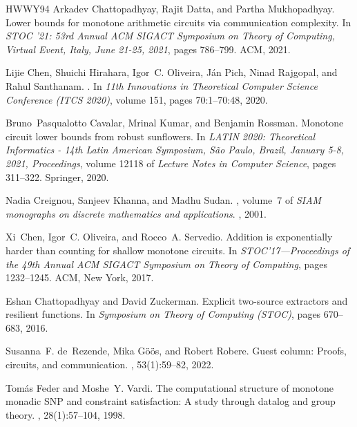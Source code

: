 \documentclass[10pt,a4paper]{article}
\begin{document}
\begin{thebibliography}{HWWY94}
Arkadev Chattopadhyay, Rajit Datta, and Partha Mukhopadhyay.
\newblock Lower bounds for monotone arithmetic circuits via communication
  complexity.
\newblock In {\em {STOC} '21: 53rd Annual {ACM} {SIGACT} Symposium on Theory of
  Computing, Virtual Event, Italy, June 21-25, 2021}, pages 786--799. {ACM},
  2021.

Lijie Chen, Shuichi Hirahara, Igor~C. Oliveira, J{\'a}n Pich, Ninad Rajgopal,
  and Rahul Santhanam.
.
\newblock In {\em 11th Innovations in Theoretical Computer Science Conference
  (ITCS 2020)}, volume 151, pages 70:1--70:48, 2020.

Bruno~Pasqualotto Cavalar, Mrinal Kumar, and Benjamin Rossman.
\newblock Monotone circuit lower bounds from robust sunflowers.
\newblock In {\em {LATIN} 2020: Theoretical Informatics - 14th Latin American
  Symposium, S{\~{a}}o Paulo, Brazil, January 5-8, 2021, Proceedings}, volume
  12118 of {\em Lecture Notes in Computer Science}, pages 311--322. Springer,
  2020.

Nadia Creignou, Sanjeev Khanna, and Madhu Sudan.
, volume~7 of {\em {SIAM} monographs on discrete mathematics and
  applications}.
, 2001.

Xi~Chen, Igor~C. Oliveira, and Rocco~A. Servedio.
\newblock Addition is exponentially harder than counting for shallow monotone
  circuits.
\newblock In {\em S{TOC}'17---{P}roceedings of the 49th {A}nnual {ACM} {SIGACT}
  {S}ymposium on {T}heory of {C}omputing}, pages 1232--1245. ACM, New York,
  2017.

Eshan Chattopadhyay and David Zuckerman.
\newblock Explicit two-source extractors and resilient functions.
\newblock In {\em Symposium on Theory of Computing \emph{(STOC)}}, pages
  670--683, 2016.

Susanna~F. de~Rezende, Mika G{\"{o}}{\"{o}}s, and Robert Robere.
\newblock Guest column: Proofs, circuits, and communication.
, 53(1):59--82, 2022.

Tom{\'{a}}s Feder and Moshe~Y. Vardi.
\newblock The computational structure of monotone monadic {SNP} and constraint
  satisfaction: {A} study through datalog and group theory.
, 28(1):57--104, 1998.


\end{thebibliography}
\end{document}
